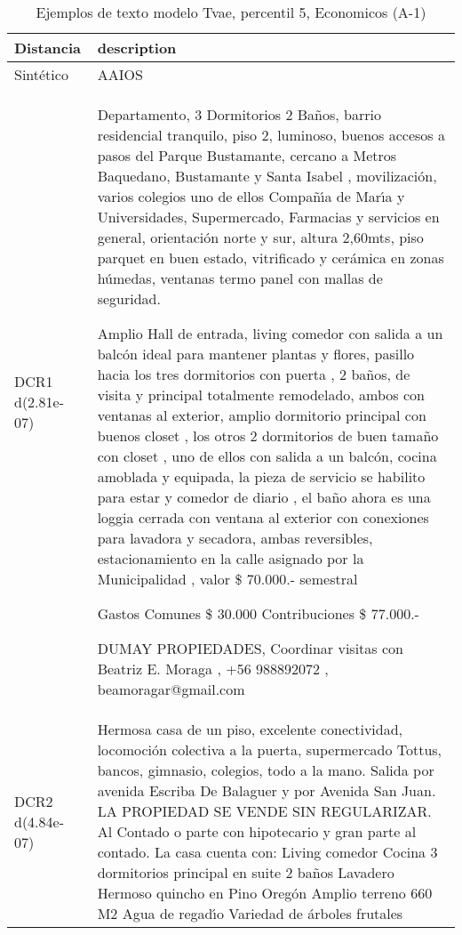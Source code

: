 \begin{table}[H]
\centering
\fontsize{10}{14}\selectfont
\caption{Ejemplos de texto modelo Tvae, percentil 5, Economicos (A-1)}
\label{table-example-economicos-a-1-tvae-5p-text}
\begin{tabular}{|l|m{35em}|}
\hline
\rowcolor[gray]{0.8}
Distancia & description \\
\hline Sintético & AAIOS \\
\hline DCR1 d(2.81e-07) & Departamento, 3 Dormitorios 2 Ba\~nos, barrio residencial tranquilo, piso 2, luminoso, buenos accesos a pasos del Parque Bustamante, cercano a Metros Baquedano, Bustamante y Santa Isabel , movilizaci\'on, varios colegios uno de ellos Compa\~n{\'\i}a de Mar{\'\i}a y  Universidades,  Supermercado, Farmacias  y servicios en general,  orientaci\'on norte y sur, altura 2,60mts,  piso parquet en buen estado, vitrificado y cer\'amica en zonas h\'umedas, ventanas termo panel con mallas de seguridad.  

Amplio Hall de entrada, living comedor con salida a un balc\'on ideal para mantener  plantas y flores,  pasillo hacia los tres dormitorios con puerta , 2 ba\~nos, de visita y principal  totalmente remodelado, ambos con ventanas al exterior, amplio dormitorio principal con  buenos closet , los otros 2 dormitorios de buen tama\~no  con closet , uno de ellos con salida a un balc\'on, cocina amoblada y equipada,  la pieza de servicio se habilito para estar y comedor de diario , el ba\~no  ahora es una loggia cerrada con ventana al exterior con conexiones para lavadora y secadora, ambas reversibles, estacionamiento en la calle asignado por la Municipalidad , valor \$ 70.000.- semestral


Gastos Comunes \$ 30.000
Contribuciones \$ 77.000.-

DUMAY PROPIEDADES,  Coordinar visitas con Beatriz E. Moraga , +56 988892072   , beamoragar@gmail.com \\
\hline DCR2 d(4.84e-07) & Hermosa casa de un piso, excelente conectividad, locomoci\'on colectiva a la puerta, supermercado Tottus, bancos, gimnasio, colegios, todo a la mano. Salida por avenida Escriba De Balaguer y por Avenida San Juan. LA PROPIEDAD SE VENDE SIN REGULARIZAR. Al Contado o parte con hipotecario y gran parte al contado. La casa cuenta con: Living comedor Cocina 3 dormitorios principal en suite 2 ba\~nos Lavadero Hermoso quincho en Pino Oreg\'on Amplio terreno 660 M2 Agua de regad{\'\i}o Variedad de \'arboles frutales \\
\hline
\end{tabular}
\end{table}
